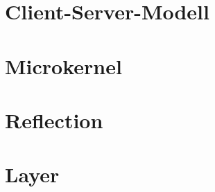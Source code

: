 
\section{Client-Server-Modell}


\section{Microkernel}


\section{Reflection}


\pagebreak
\section{Layer}
